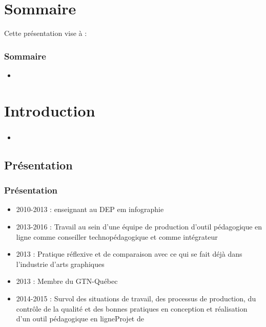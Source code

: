 	
	
	\frame{\titlepage} 
	\usebackgroundtemplate{ } 
	\section{Sommaire} 
		\begin{frame}
			Cette présentation vise à :
			\frametitle{Sommaire}
			\begin {itemize}
				\item 
			\end{itemize}
		\end{frame}


	\section{Introduction} 
		\begin{frame}[allowframebreaks]
			\frametitle{}
			\begin {itemize}
				\item 
			\end{itemize}
		\end{frame}
		
	\subsection{Présentation} 
		\begin{frame}[allowframebreaks]
			\frametitle{Présentation}
			\begin {itemize}
				
                                \item 2010-2013 : enseignant au DEP em  infographie
                                \item 2013-2016 : Travail au sein d’une équipe de production d’outil pédagogique en ligne comme conseiller technopédagogique et comme intégrateur
                                \item 2013 : Pratique réflexive et de comparaison avec ce qui se fait déjà dans l’industrie d’arts graphiques
                                \item 2013 : Membre du GTN-Québec
                                \item 2014-2015 : Survol des situations de travail, des processus de production, du contrôle de la qualité et des bonnes pratiques en conception et réalisation d’un outil pédagogique en ligneProjet de   
			\end{itemize}
		\end{frame}
			

